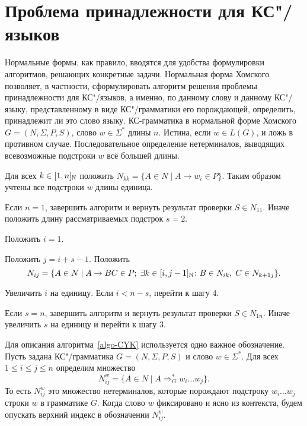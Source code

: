 \section{Проблема принадлежности для КС"/языков}
\label{Chapter7ProblemB}
Нормальные формы, как правило, вводятся для удобства формулировки
алгоритмов, решающих конкретные задачи. Нормальная форма Хомского
позволяет, в частности, сформулировать алгоритм решения проблемы
принадлежности для КС"/языков, а именно, по данному слову и данному
КС"/языку, представленному в виде КС"/грамматики его порождающей,
определить, принадлежит ли это слово языку.
{\label{algo-CYK}КС-грамматика в нормальной форме Хомского $G=(N,\Sigma,P,S)$,
слово $w\in \Sigma^*$ длины $n$.}
{Истина, если $w \in L(G)$, и ложь в противном случае.}
{Последовательное определение нетерминалов, выводящих
всевозможные подстроки $w$ всё большей длины.}
{
\item Для всех $k\in [1,n]_{\mathbb N}$ положить $N_{kk} = \{ A \in N \mid
    A \to w_i \in P\}$. Таким образом учтены все подстроки $w$ длины
    единица.

\item Если $n=1$, завершить алгоритм и вернуть результат
    проверки $S \in N_{11}$. Иначе положить длину
    рассматриваемых подстрок $s = 2$.

\item Положить $i = 1$.

\item
    Положить $j = i + s - 1$. Положить
    \[
        N_{ij} = \{ A \in N \mid A \to BC \in P; \;
                \exists k \in [i, j-1]_{\mathbb N} \colon B \in N_{ik}, \;
                C \in N_{k+1 j} \}.
    \]

\item Увеличить $i$ на единицу. Если $ i < n - s$, перейти
    к шагу 4.

\item Если $s = n$, завершить алгоритм и вернуть результат
    проверки $S \in N_{1n}$. Иначе увеличить $s$ на единицу и
    перейти к шагу 3.
}
Для описания алгоритма~\ref{algo-CYK} используется
одно важное обозначение. Пусть задана
КС"/грамматика $G=(N,\Sigma,P,S)$ и слово $w\in \Sigma^*$.
Для всех $1 \leqslant i \leqslant j \leqslant n$
определим множество
\[
    N_{ij}^w = \{ A \in N \mid A \Rightarrow^*_G w_i \ldots w_j \}.
\]
То есть $N_{ij}^w$ это множество нетерминалов, которые порождают
подстроку $w_i \ldots w_j$ строки $w$ в грамматике $G$. Когда слово
$w$ фиксировано и ясно из контекста, будем опускать верхний индекс
в обозначении $N_{ij}^w$.


